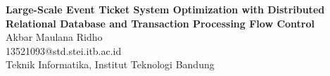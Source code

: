 \documentclass[a0,landscape]{config/poster/a0poster}
\begin{document}

\begin{minipage}[c]{0.8\linewidth}
    \veryHuge \textbf{Large-Scale Event Ticket System Optimization with Distributed Relational Database and Transaction Processing Flow Control} \\[1.5cm]
    \LARGE {Akbar Maulana Ridho} \\
    \Large {13521093@std.stei.itb.ac.id} \\
    \Large {Teknik Informatika, Institut Teknologi Bandung}
\end{minipage}

\vspace{1cm} %

\end{document}
